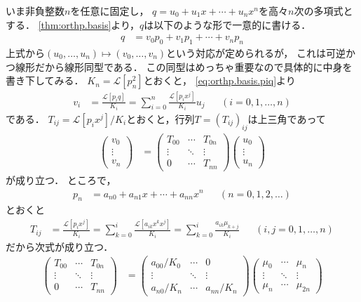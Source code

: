 \documentclass{jlreq}
\theoremstyle{definition}
\newcommand{\mcL}{\mathcal{L}}
\begin{document}
いま非負整数\(n\)を任意に固定し，
\(q=u_0+u_1x+\cdots+u_n x^n\)を高々\(n\)次の多項式とする．
\cref{thm:orthp.basis}より，\(q\)は以下のような形で一意的に書ける．
\begin{align}
  q &= v_0 p_0+v_1 p_1+\cdots+v_n p_n
\end{align}
上式から\((u_0,\dots,u_n)\longmapsto(v_0,\dots,v_n)\)という対応が定められるが，
これは可逆かつ線形だから線形同型である．
この同型はめっちゃ重要なので具体的に中身を書き下してみる．
\(K_n=\mcL[p_n^2]\)とおくと，
\cref{eq:orthp.basis.piq}より
\begin{align}
  v_i
  &= \frac{\mcL[p_i q]}{K_i}
  = \sum_{i=0}^n \frac{\mcL[p_i x^j]}{K_i} u_j
  & &(i=0,1,\dots,n)
\end{align}
である．
\(T_{ij}=\mcL[p_i x^j]/K_i\)とおくと，行列\(T=(T_{ij})_{ij}\)は上三角であって
\begin{align}
  \begin{pmatrix}
    v_0 \\ \vdots \\ v_n
  \end{pmatrix}
  &=
  \begin{pmatrix}
    T_{00} & \cdots & T_{0n} \\
    \vdots & \ddots & \vdots \\
    0 & \cdots & T_{nn}
  \end{pmatrix}
  \begin{pmatrix}
    u_0 \\ \vdots \\ u_n
  \end{pmatrix}
\end{align}
が成り立つ．
ところで，
\begin{align}
  p_n &= a_{n0} + a_{n1} x + \cdots + a_{nn}x^n
  & &(n=0,1,2,\dots)
\end{align}
とおくと
\begin{align}
  T_{ij}
  &= \frac{\mcL[p_i x^j]}{K_i}
  = \sum_{k=0}^i \frac{\mcL[a_{ik}x^k x^j]}{K_i}
  = \sum_{k=0}^i \frac{a_{ik}\mu_{k+j}}{K_i}
  & &(i, j=0,1,\dots,n)
\end{align}
だから次式が成り立つ．
\begin{align}
  \begin{pmatrix}
    T_{00} & \cdots & T_{0n} \\
    \vdots & \ddots & \vdots \\
    0 & \cdots & T_{nn}
  \end{pmatrix}
  &=
  \begin{pmatrix}
    a_{00}/K_0 & \cdots & 0 \\
    \vdots & \ddots & \vdots \\
    a_{n0}/K_n & \cdots & a_{nn}/K_n
  \end{pmatrix}
  \begin{pmatrix}
    \mu_0 & \cdots & \mu_n \\
    \vdots & \ddots & \vdots \\
    \mu_n & \cdots & \mu_{2n}
  \end{pmatrix}
  \label{eq:T.AH}
\end{align}
\end{document}
